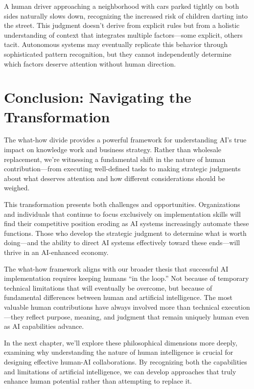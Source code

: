 \documentclass[
  Letterpaper,
]{scrbook}
\begin{document}
A human driver approaching a neighborhood with cars parked tightly on
both sides naturally slows down, recognizing the increased risk of
children darting into the street. This judgment doesn't derive from
explicit rules but from a holistic understanding of context that
integrates multiple factors---some explicit, others tacit. Autonomous
systems may eventually replicate this behavior through sophisticated
pattern recognition, but they cannot independently determine which
factors deserve attention without human direction.

\section{Conclusion: Navigating the
Transformation}\label{conclusion-navigating-the-transformation}

The what-how divide provides a powerful framework for understanding AI's
true impact on knowledge work and business strategy. Rather than
wholesale replacement, we're witnessing a fundamental shift in the
nature of human contribution---from executing well-defined tasks to
making strategic judgments about what deserves attention and how
different considerations should be weighed.

This transformation presents both challenges and opportunities.
Organizations and individuals that continue to focus exclusively on
implementation skills will find their competitive position eroding as AI
systems increasingly automate these functions. Those who develop the
strategic judgment to determine what is worth doing---and the ability to
direct AI systems effectively toward these ends---will thrive in an
AI-enhanced economy.

The what-how framework aligns with our broader thesis that successful AI
implementation requires keeping humans ``in the loop.'' Not because of
temporary technical limitations that will eventually be overcome, but
because of fundamental differences between human and artificial
intelligence. The most valuable human contributions have always involved
more than technical execution---they reflect purpose, meaning, and
judgment that remain uniquely human even as AI capabilities advance.

In the next chapter, we'll explore these philosophical dimensions more
deeply, examining why understanding the nature of human intelligence is
crucial for designing effective human-AI collaborations. By recognizing
both the capabilities and limitations of artificial intelligence, we can
develop approaches that truly enhance human potential rather than
attempting to replace it.
\end{document}
